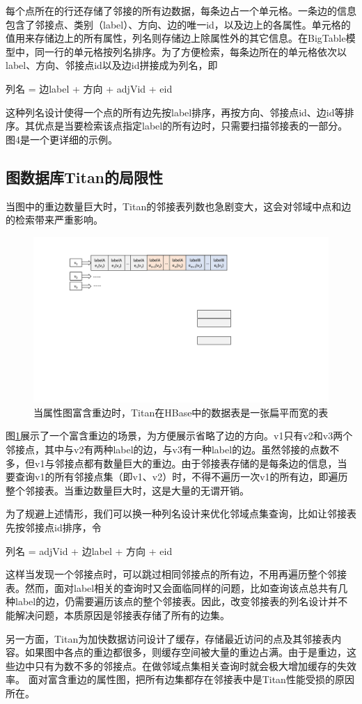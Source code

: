每个点所在的行还存储了邻接的所有边数据，每条边占一个单元格。一条边的信息包含了邻接点、类别（label）、方向、边的唯一id，以及边上的各属性。单元格的值用来存储边上的所有属性，列名则存储边上除属性外的其它信息。在BigTable模型中，同一行的单元格按列名排序。为了方便检索，每条边所在的单元格依次以label、方向、邻接点id以及边id拼接成为列名，即
\begin{center}
  列名 = 边label + 方向 + adjVid + eid
\end{center}
这种列名设计使得一个点的所有边先按label排序，再按方向、邻接点id、边id等排序。其优点是当要检索该点指定label的所有边时，只需要扫描邻接表的一部分。图4是一个更详细的示例。

\subsection{图数据库Titan的局限性}
当图中的重边数量巨大时，Titan的邻接表列数也急剧变大，这会对邻域中点和边的检索带来严重影响。

\begin{figure}[htbp]
\centering
\includegraphics[width=150mm]{fig/original_list.pdf}
\caption{当属性图富含重边时，Titan在HBase中的数据表是一张扁平而宽的表}
\label{fig:orginal_list}
\end{figure}

图\ref{fig:orginal_list}展示了一个富含重边的场景，为方便展示省略了边的方向。v1只有v2和v3两个邻接点，其中与v2有两种label的边，与v3有一种label的边。虽然邻接的点数不多，但v1与邻接点都有数量巨大的重边。由于邻接表存储的是每条边的信息，当要查询v1的所有邻接点集（即v1、v2）时，不得不遍历一次v1的所有边，即遍历整个邻接表。当重边数量巨大时，这是大量的无谓开销。

为了规避上述情形，我们可以换一种列名设计来优化邻域点集查询，比如让邻接表先按邻接点id排序，令
\begin{center}
  列名 = adjVid + 边label + 方向 + eid
\end{center}
这样当发现一个邻接点时，可以跳过相同邻接点的所有边，不用再遍历整个邻接表。然而，面对label相关的查询时又会面临同样的问题，比如查询该点总共有几种label的边，仍需要遍历该点的整个邻接表。因此，改变邻接表的列名设计并不能解决问题，本质原因是邻接表存储了所有的边集。

另一方面，Titan为加快数据访问设计了缓存，存储最近访问的点及其邻接表内容。如果图中各点的重边都很多，则缓存空间被大量的重边占满。由于是重边，这些边中只有为数不多的邻接点。在做邻域点集相关查询时就会极大增加缓存的失效率。
面对富含重边的属性图，把所有边集都存在邻接表中是Titan性能受损的原因所在。

